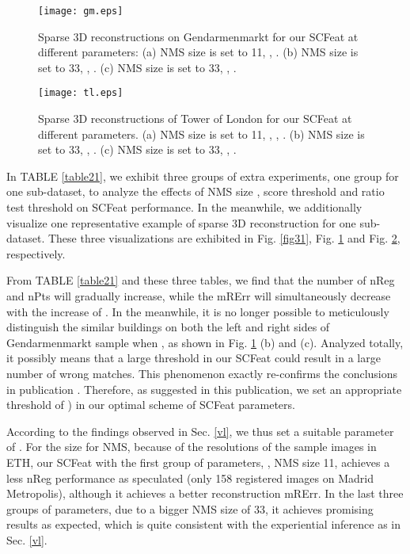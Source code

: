 \documentclass[journal]{IEEEtran}
\begin{document}
\begin{figure}[!t]
\centering
\texttt{[image: gm.eps]}
\caption{Sparse 3D reconstructions on Gendarmenmarkt for our SCFeat at different parameters: (a) NMS size  is set to 11, , . (b) NMS size  is set to 33, , . (c) NMS size  is set to 33, , .}
\label{fig32}
\end{figure}

\begin{figure}[!t]
\centering
\texttt{[image: tl.eps]}
\caption{Sparse 3D reconstructions of Tower of London for our SCFeat at different parameters. (a) NMS size  is set to 11, , , . (b) NMS size  is set to 33, , . (c) NMS size  is set to 33, , .}
\label{fig33}
\end{figure}

In TABLE \ref{table21}, we exhibit three groups of extra experiments, one group for one sub-dataset, to analyze the effects of NMS size , score threshold  and ratio test threshold  on SCFeat performance. 
In the meanwhile, we additionally visualize one representative example of sparse 3D reconstruction for one sub-dataset. These three visualizations are exhibited in Fig. \ref{fig31}, Fig. \ref{fig32} and Fig. \ref{fig33}, respectively. 

From TABLE \ref{table21} and these three tables, we find that the number of nReg and nPts will gradually increase, while the mRErr will simultaneously decrease with the increase of . In the meanwhile, it is no longer possible to meticulously distinguish the similar buildings on both the left and right sides of Gendarmenmarkt sample when , as shown in Fig. \ref{fig32} (b) and (c).
Analyzed totally, it possibly means that a large threshold  in our SCFeat could result in a large number of wrong matches. This phenomenon exactly re-confirms the conclusions in publication \cite{hcrt:21}. Therefore, as suggested in this publication, we set an appropriate threshold of ) in our optimal scheme of SCFeat parameters.


According to the findings observed in Sec. \ref{vl}, we thus set a suitable parameter of . For the size  for NMS, because of the resolutions of the sample images in ETH, our SCFeat with the first group of parameters, , NMS size 11, achieves a less nReg performance as speculated (only 158 registered images on Madrid Metropolis), although it achieves a better reconstruction mRErr. In the last three groups of parameters, due to a bigger NMS size of 33, it achieves promising results as expected, which is quite consistent with the experiential inference as in Sec. \ref{vl}.
\end{document}
